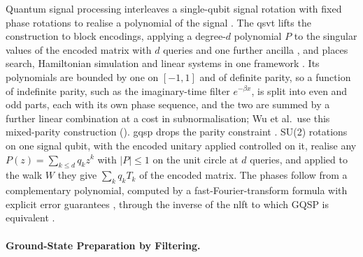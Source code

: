 Quantum signal processing interleaves a single-qubit signal rotation with fixed phase rotations to realise a polynomial of the signal \cite{lowchuang2017qsp}. The \gls{qsvt} lifts the construction to block encodings, applying a degree-$d$ polynomial $P$ to the singular values of the encoded matrix with $d$ queries and one further ancilla \cite{gilyen2019qsvt}, and places search, Hamiltonian simulation and linear systems in one framework \cite{martyn2021grand}. Its polynomials are bounded by one on $[-1,1]$ and of definite parity, so a function of indefinite parity, such as the imaginary-time filter $e^{-\beta x}$, is split into even and odd parts, each with its own phase sequence, and the two are summed by a further linear combination at a cost in subnormalisation; Wu et al.\ use this mixed-parity construction (). \Gls{gqsp} drops the parity constraint \cite{motlagh2024gqsp}. SU(2) rotations on one signal qubit, with the encoded unitary applied controlled on it, realise any $P(z)=\sum_{k\le d}q_kz^k$ with $|P|\le1$ on the unit circle at $d$ queries, and applied to the walk $W$ they give $\sum_kq_kT_k$ of the encoded matrix. The phases follow from a complementary polynomial, computed by a fast-Fourier-transform formula with explicit error guarantees \cite{berntson2025complementary}, through the inverse of the \gls{nlft} to which GQSP is equivalent \cite{laneve2025gqspnlft,nlfft2025su2}.

\paragraph{Ground-State Preparation by Filtering.}
\label{sec:bg-filtering}

